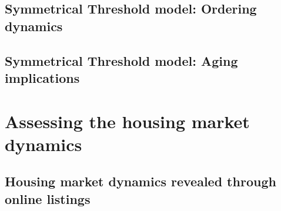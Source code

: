 \documentclass[
	11pt, %
	a4paper,
]{LegrandOrangeBook}
\begin{document}
\renewcommand{\thechapter}{6A} %
\chapterspaceabove{6.75cm}
\chapterspacebelow{7.25cm}

\chapter{\label{ch:Ordering dynamics in the Symmetrical Threshold model} Symmetrical Threshold model: Ordering dynamics}
%

\renewcommand{\thechapter}{6B} %
\chapterspaceabove{6.75cm}
\chapterspacebelow{7.25cm}

\chapter{\label{ch:Aging implications in the Symmetrical Threshold model} Symmetrical Threshold model: Aging implications}
%


\part{Assessing the housing market dynamics}

\renewcommand{\thechapter}{7} %
\chapterspaceabove{6.75cm}
\chapterspacebelow{7.25cm}

\chapter{Housing market dynamics revealed through online listings \label{ch:Housing market dynamics revealed through online listings}}
%
\end{document}
